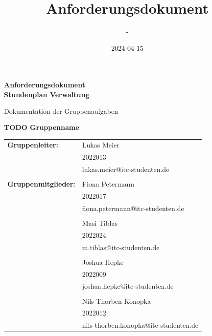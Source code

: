 \documentclass[11pt,a4paper]{article}
\title{Anforderungsdokument}
\date{2024-04-15}
\author{-}
\begin{document}
	\begin{titlepage}
		\begin{center}
			\Huge
			\textbf{Anforderungsdokument\\ Stundenplan Verwaltung}
			
			\vspace{0.5cm}
			\LARGE
			Dokumentation der Gruppenaufgaben
			
			\vspace{1.5cm}
			
			\textbf{TODO Gruppenname}
			
			\vspace{1.75cm}
			
			\vfill
			
			\vspace{1.0cm}
			\large
			\begin{tabular}{p{8cm}l}
				\textbf{Gruppenleiter:} & Lukas Meier\\
				& 2022013\\
				& lukas.meier@itc-studenten.de\\ 
				&\\
				\textbf{Gruppenmitglieder:} & Fiona Petermann\\
				& 2022017\\
				& fiona.petermann@itc-studenten.de\\
				&\\
				& Masi Tiblas\\
				& 2022024\\
				& m.tiblas@itc-studenten.de\\
				&\\
				& Joshua Hepke\\
				& 2022009\\
				& joshua.hepke@itc-studenten.de\\
				&\\
				& Nils Thorben Konopka\\
				& 2022012\\
				& nils-thorben.konopka@itc-studenten.de
			\end{tabular}
			\vfill
		\end{center}
	\end{titlepage}
	
	\newpage
	
	\setcounter{tocdepth}{2}
	\setcounter{secnumdepth}{3}
	\tableofcontents
	
	\newpage
	
	
	
	
	
	
	
	
	
	
	
	
	
\end{document}

